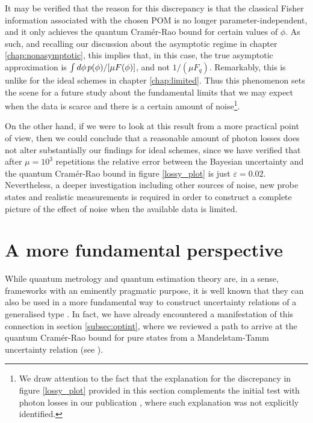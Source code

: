 It may be verified that the reason for this discrepancy is that the classical Fisher information associated with the chosen POM is no longer parameter-independent, and it only achieves the quantum Cram\'{e}r-Rao bound for certain values of $\phi$. As such, and recalling our discussion about the asymptotic regime in chapter \ref{chap:nonasymptotic}, this implies that, in this case, the true asymptotic approximation is $\int d\phi \hspace{0.15em}p(\phi)/[\mu F(\phi)]$, and not $1/(\mu F_q)$. Remarkably, this is unlike for the ideal schemes in chapter \ref{chap:limited}. Thus this phenomenon sets the scene for a future study about the fundamental limits that we may expect when the data is scarce and there is a certain amount of noise\footnote{We draw attention to the fact that the explanation for the discrepancy in figure \ref{lossy_plot} provided in this section complements the initial test with photon losses in our publication \cite{jesus2018}, where such explanation was not explicitly identified.}. 

On the other hand, if we were to look at this result from a more practical point of view, then we could conclude that a reasonable amount of photon losses does not alter substantially our findings for ideal schemes, since we have verified that after $\mu = 10^3$ repetitions the relative error between the Bayesian uncertainty and the quantum Cram\'{e}r-Rao bound in figure \ref{lossy_plot} is just $\varepsilon = 0.02$. Nevertheless, a deeper investigation including other sources of noise, new probe states and realistic measurements is required in order to construct a complete picture of the effect of noise when the available data is limited. 

\section{A more fundamental perspective}
\label{sec:fundtime}

While quantum metrology and quantum estimation theory are, in a sense, frameworks with an eminently pragmatic purpose, it is well known that they can also be used in a more fundamental way to construct uncertainty relations of a generalised type \cite{braunstein1996, helstrom1976}. In fact, we have already encountered a manifestation of this connection in section \ref{subsec:optint}, where we reviewed a path to arrive at the quantum Cram\'{e}r-Rao bound for pure states from a Mandelstam-Tamm uncertainty relation (see \cite{HofmannHolger2009}). 

